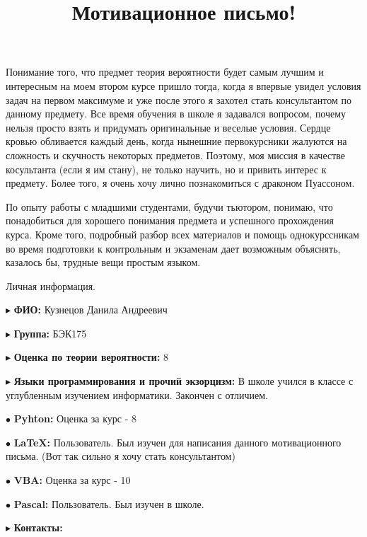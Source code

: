 \documentclass[a4paper,12pt]{article}
\title{Мотивационное письмо!}
\author{}
\date{}
\begin{document}
 
	
	\maketitle

	Понимание того, что предмет \glqq теория вероятности\grqq{} будет самым лучшим и интересным на моем втором курсе пришло тогда, когда я впервые увидел условия задач на первом максимуме и уже после этого я захотел стать консультантом по данному предмету. Все время обучения в школе я задавался вопросом, почему нельзя просто взять и придумать оригинальные и веселые условия. Сердце кровью обливается каждый день, когда нынешние первокурсники жалуются на сложность и скучность некоторых предметов. Поэтому, моя миссия в качестве косультанта (если я им стану), не только научить, но и привить интерес к предмету. Более того, я очень хочу лично познакомиться с драконом Пуассоном.
	
	По опыту работы с младшими студентами, будучи тьютором, понимаю, что понадобиться для хорошего понимания предмета и успешного прохождения курса. Кроме того, подробный разбор всех материалов и помощь однокурссникам во время подготовки к контрольным и экзаменам дает возможным объяснять, казалось бы, трудные вещи простым языком. 

\par\bigskip
\begin{center}
	\textsf{\LARGE Личная информация.}
\end{center}
\par\bigskip
$\blacktriangleright$ \textbf{ФИО:} Кузнецов Данила Андреевич 

$\blacktriangleright$ \textbf{Группа:} БЭК175

$\blacktriangleright$ \textbf{Оценка по теории вероятности:} 8

$\blacktriangleright$ \textbf{Языки программирования и прочий экзорцизм:} В школе учился в классе с углубленным изучением информатики. Закончен с отличием.

$\bullet$ \textbf{Pyhton:} Оценка за курс - 8

$\bullet$ \textbf{LaTeX:} Пользователь. Был изучен для написания данного мотивационного письма. (Вот так сильно я хочу стать консультантом)

$\bullet$ \textbf{VBA:} Оценка за курс - 10

$\bullet$ \textbf{Pascal:} Пользователь. Был изучен в школе.

$\blacktriangleright$ \textbf{Контакты:}
\end{document}
